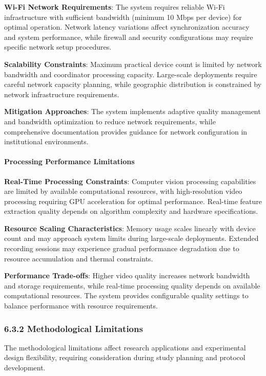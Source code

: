 \documentclass[12pt,a4paper]{article}
\begin{document}
\textbf{Wi-Fi Network Requirements}: The system requires reliable Wi-Fi infrastructure with sufficient bandwidth (minimum 10
Mbps per device) for optimal operation. Network latency variations affect synchronization accuracy and system
performance, while firewall and security configurations may require specific network setup procedures.

\textbf{Scalability Constraints}: Maximum practical device count is limited by network bandwidth and coordinator processing
capacity. Large-scale deployments require careful network capacity planning, while geographic distribution is
constrained by network infrastructure requirements.

\textbf{Mitigation Approaches}: The system implements adaptive quality management and bandwidth optimization to reduce
network requirements, while comprehensive documentation provides guidance for network configuration in institutional
environments.

\paragraph{Processing Performance Limitations}

\textbf{Real-Time Processing Constraints}: Computer vision processing capabilities are limited by available computational
resources, with high-resolution video processing requiring GPU acceleration for optimal performance. Real-time feature
extraction quality depends on algorithm complexity and hardware specifications.

\textbf{Resource Scaling Characteristics}: Memory usage scales linearly with device count and may approach system limits
during large-scale deployments. Extended recording sessions may experience gradual performance degradation due to
resource accumulation and thermal constraints.

\textbf{Performance Trade-offs}: Higher video quality increases network bandwidth and storage requirements, while real-time
processing quality depends on available computational resources. The system provides configurable quality settings to
balance performance with resource requirements.

\subsubsection{6.3.2 Methodological Limitations}

The methodological limitations affect research applications and experimental design flexibility, requiring consideration
during study planning and protocol development.
\end{document}
